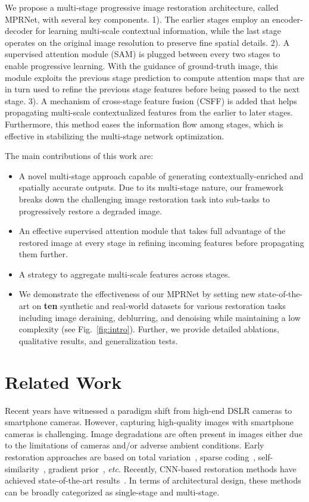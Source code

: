 \documentclass[10pt,twocolumn,letterpaper]{article}
\begin{document}
We propose a multi-stage progressive image restoration architecture, called MPRNet, with several key components.
1). The earlier stages employ an encoder-decoder for learning multi-scale contextual information, while the last stage operates on the original image resolution to preserve fine spatial details. 
2). A supervised attention module (SAM) is plugged between every two stages to enable progressive learning. 
With the guidance of ground-truth image, this module exploits the previous stage prediction to compute attention maps that are in turn used to refine the previous stage features before being passed to the next stage.  
3). A mechanism of cross-stage feature fusion (CSFF) is added that helps propagating multi-scale contextualized features from the earlier to later stages. 
Furthermore, this method eases the information flow among stages, which is effective in stabilizing the multi-stage network optimization. 


\noindent The main contributions of this work are:\vspace{-0.5em}
\begin{itemize}[leftmargin=*]\setlength{\itemsep}{0em}
    \item  A novel multi-stage approach capable of generating contextually-enriched and spatially accurate outputs. Due to its multi-stage nature, our framework breaks down the challenging image restoration task into sub-tasks to progressively restore a degraded image. 
    \item An effective supervised attention module that takes full advantage of the restored image at every stage in refining incoming features before propagating them further. 
    \item A strategy to aggregate multi-scale features across stages. 
    \item We demonstrate the effectiveness of our MPRNet by setting new state-of-the-art on \textbf{ten} synthetic and real-world datasets for various restoration tasks including image deraining, deblurring, and denoising while maintaining a low complexity (see Fig.~\ref{fig:intro}). Further, we provide detailed ablations, qualitative results, and generalization tests. 
\end{itemize}


\section{Related Work}
Recent years have witnessed a paradigm shift from high-end DSLR cameras to smartphone cameras. 
However, capturing high-quality images with smartphone cameras is challenging. 
Image degradations are often present in images either due to the limitations of cameras and/or adverse ambient conditions. 
Early restoration approaches are based on total variation~\cite{chan1998total,rudin1992nonlinear}, sparse coding~\cite{KSVD,luo2015removing,mairal2007sparse}, self-similarity~\cite{NLM,BM3D}, gradient prior~\cite{shan2008high,xu2013unnatural}, \textit{etc}.
Recently, CNN-based restoration methods have achieved state-of-the-art results~\cite{pan2020exploiting,Maitreya2020,zamir2020cycleisp,DnCNN,zhang2020rdn}. 
In terms of architectural design, these methods can be broadly categorized as single-stage and multi-stage. 
\end{document}
